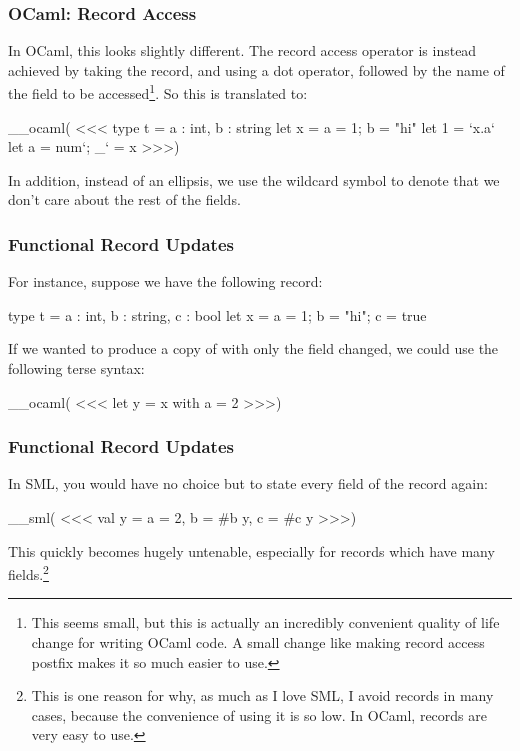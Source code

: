 \documentclass[aspectratio=169, handout]{beamer}
\begin{document}
\begin{frame}[fragile]
  \frametitle{OCaml: Record Access}

  In OCaml, this looks slightly different. The record access operator is instead
  achieved by taking the record, and using a dot operator, followed by the name
  of the field to be accessed\footnote{This seems small, but this is actually
  an incredibly convenient quality of life change for writing OCaml code. A small
  change like making record access postfix makes it so much easier to use.}. So this is translated to:

  \vspace{\fill}

__ocaml(
<<<
  type t = { a : int, b : string }
  let x = {a = 1; b = "hi"}
  let 1 = `x.a`
  let {a = num`; _`} = x
>>>)

  \vspace{\fill}

  In addition, instead of an ellipsis, we use the wildcard symbol \code{_} to denote that we
  don't care about the rest of the fields.
\end{frame}

\begin{frame}[fragile]
  \frametitle{Functional Record Updates}


  \vspace{\fill}

  For instance, suppose we have the following record:
  \begin{codeblock}
    type t = {a : int, b : string, c : bool}
    let x = {a = 1; b = "hi"; c = true}
  \end{codeblock}

  \vspace{\fill}

  If we wanted to produce a copy of  with only the field  changed,
  we could use the following terse syntax:

  \vspace{\fill}

__ocaml(
<<<
  let y = {x with a = 2}
>>>)
\end{frame}

\begin{frame}[fragile]
  \frametitle{Functional Record Updates}

  In SML, you would have no choice but to state every field of the record again:

  \vspace{\fill}

__sml(
<<<
  val y = {a = 2, b = #b y, c = #c y}
>>>)

  \vspace{\fill}

  This quickly becomes hugely untenable, especially for records which have many
  fields.\footnote{This is one reason for why, as much as I love SML, I avoid records
  in many cases, because the convenience of using it is so low. In OCaml, records
  are very easy to use.}
\end{frame}
\end{document}
